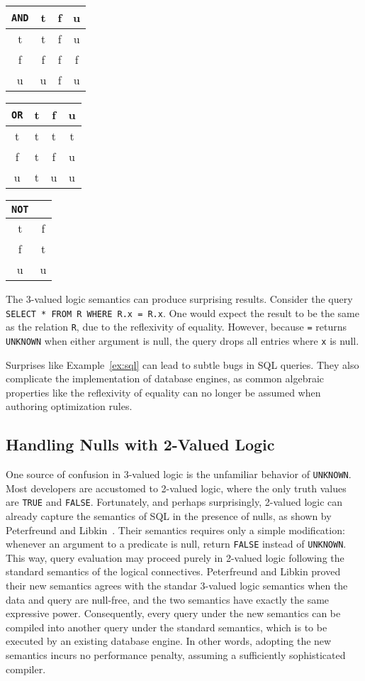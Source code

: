 \documentclass[sigconf]{acmart}
\begin{document}
\begin{tabular}{ c|ccc } 
  \lstinline|AND| & t & f & u \\ 
  \hline
  t & t & f & u \\
  f & f & f & f \\
  u & u & f & u
\end{tabular}\qquad
%
\begin{tabular}{ c|ccc } 
  \lstinline|OR| & t & f & u \\ 
  \hline
  t & t & t & t \\
  f & t & f & u \\
  u & t & u & u
\end{tabular}\qquad
%
\begin{tabular}{ c|c } 
  \lstinline|NOT| &  \\ 
  \hline
  t & f \\
  f & t \\
  u & u 
\end{tabular}\quad

\begin{example}
\label{ex:sql}
The 3-valued logic semantics can produce surprising results.
Consider the query \lstinline|SELECT * FROM R WHERE R.x = R.x|.
One would expect the result to be the same as the relation \lstinline|R|,
 due to the reflexivity of equality.
However, because \lstinline|=| returns \lstinline|UNKNOWN| 
 when either argument is null,
 the query drops all entries 
 where \lstinline|x| is null.
\end{example}

Surprises like Example~\ref{ex:sql} 
 can lead to subtle bugs in SQL queries. 
They also complicate the implementation of database engines, 
 as common algebraic properties like the reflexivity of equality
 can no longer be assumed when authoring optimization rules.

\subsection{Handling Nulls with 2-Valued Logic}

One source of confusion in 3-valued logic
 is the unfamiliar behavior of \lstinline|UNKNOWN|.
Most developers are accustomed to 2-valued logic,
 where the only truth values are \lstinline|TRUE| and \lstinline|FALSE|.
Fortunately, and perhaps surprisingly,
 2-valued logic can already capture the semantics of SQL 
 in the presence of nulls, 
 as shown by Peterfreund and Libkin~\cite{DBLP:conf/pods/LibkinP23}.
Their semantics requires only a simple modification:
 whenever an argument to a predicate is null,
 return \lstinline|FALSE| instead of \lstinline|UNKNOWN|.
This way, query evaluation may proceed purely in 2-valued logic
 following the standard semantics of the logical connectives.
Peterfreund and Libkin proved their new semantics 
 agrees with the standar 3-valued logic semantics
 when the data and query are null-free,
 and the two semantics have exactly the same expressive power.
Consequently, every query under the new semantics
 can be compiled into another query under the standard semantics,
 which is to be executed by an existing database engine.
In other words, adopting the new semantics 
 incurs no performance penalty,
 assuming a sufficiently sophisticated compiler.
\end{document}
